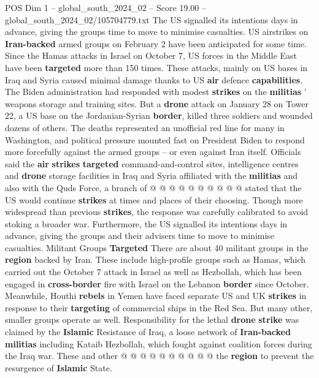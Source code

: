 \begin{textsample}{POS Dim 1 – global\_south\_2024\_02 – Score 19.00 – global\_south\_2024\_02/105704779.txt}  \label{ex:f1_pos_202}
The US signalled its intentions days in advance, giving the groups time to move to minimise casualties.
US airstrikes on \textbf{Iran-backed} armed groups on February 2 have been anticipated for some time.
Since the Hamas attacks in Israel on October 7, US forces in the Middle East have been \textbf{targeted} more than 150 times.
These attacks, mainly on US bases in Iraq and Syria caused minimal damage thanks to US \textbf{air} defence \textbf{capabilities}.
The Biden administration had responded with modest \textbf{strikes} on the \textbf{militias} ' weapons storage and training sites.
But a \textbf{drone} attack on January 28 on Tower 22, a US base on the Jordanian-Syrian \textbf{border}, killed three soldiers and wounded dozens of others.
The deaths represented an unofficial red line for many in Washington, and political pressure mounted fast on President Biden to respond more forcefully against the armed groups -- or even against Iran itself.
Officials said the \textbf{air} \textbf{strikes} \textbf{targeted} command-and-control sites, intelligence centres and \textbf{drone} storage facilities in Iraq and Syria affiliated with the \textbf{militias} and also with the Quds Force, a branch of @ @ @ @ @ @ @ @ @ @ stated that the US would continue \textbf{strikes} at times and places of their choosing.
Though more widespread than previous \textbf{strikes}, the response was carefully calibrated to avoid stoking a broader war.
Furthermore, the US signalled its intentions days in advance, giving the groups and their advisers time to move to minimise casualties.
Militant Groups \textbf{Targeted} There are about 40 militant groups in the \textbf{region} backed by Iran.
These include high-profile groups such as Hamas, which carried out the October 7 attack in Israel as well as Hezbollah, which has been engaged in \textbf{cross-border} fire with Israel on the Lebanon \textbf{border} since October.
Meanwhile, Houthi \textbf{rebels} in Yemen have faced separate US and UK \textbf{strikes} in response to their \textbf{targeting} of commercial ships in the Red Sea.
But many other, smaller groups operate as well.
Responsibility for the lethal \textbf{drone} \textbf{strike} was claimed by the \textbf{Islamic} Resistance of Iraq, a loose network of \textbf{Iran-backed} \textbf{militias} including Kataib Hezbollah, which fought against coalition forces during the Iraq war.
These and other @ @ @ @ @ @ @ @ @ @ the \textbf{region} to prevent the resurgence of \textbf{Islamic} State.

\end{textsample}
